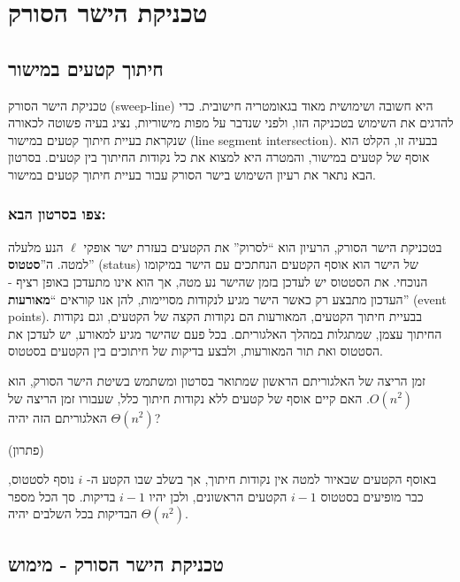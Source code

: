 \documentclass[
]{book}
\begin{document}
\hypertarget{sweep-line}{%
\section{טכניקת הישר הסורק}\label{sweep-line}}

\hypertarget{line-int}{%
\subsection{חיתוך קטעים במישור}\label{line-int}}

טכניקת הישר הסורק (sweep-line) היא חשובה ושימושית מאוד בגאומטריה
חישובית. כדי להדגים את השימוש בטכניקה הזו, ולפני שנדבר על מפות מישוריות,
נציג בעיה פשוטה לכאורה שנקראת בעיית חיתוך קטעים במישור (line segment
intersection). בבעיה זו, הקלט הוא אוסף של קטעים במישור, והמטרה היא למצוא
את כל נקודות החיתוך בין קטעים. בסרטון הבא נתאר את רעיון השימוש בישר
הסורק עבור בעיית חיתוך קטעים במישור.

\hypertarget{ux5e6ux5e4ux5d5-ux5d1ux5e1ux5e8ux5d8ux5d5ux5df-ux5d4ux5d1ux5d0-1}{%
\subsubsection*{צפו בסרטון הבא:}\label{ux5e6ux5e4ux5d5-ux5d1ux5e1ux5e8ux5d8ux5d5ux5df-ux5d4ux5d1ux5d0-1}}

בטכניקת הישר הסורק, הרעיון הוא ``לסרוק'' את הקטעים בעזרת ישר אופקי \(\ell\)
הנע מלעלה למטה. ה''\textbf{סטטוס}'' (status) של הישר הוא אוסף הקטעים הנחתכים עם
הישר במיקומו הנוכחי. את הסטטוס יש לעדכן בזמן שהישר נע מטה, אך הוא אינו
מתעדכן באופן רציף - העדכון מתבצע רק כאשר הישר מגיע לנקודות מסויימות, להן
אנו קוראים ``\textbf{מאורעות}'' (event points). בבעיית חיתוך הקטעים, המאורעות
הם נקודות הקצה של הקטעים, וגם נקודות החיתוך עצמן, שמתגלות במהלך
האלגוריתם. בכל פעם שהישר מגיע למאורע, יש לעדכן את הסטטוס ואת תור
המאורעות, ולבצע בדיקות של חיתוכים בין הקטעים בסטטוס.

זמן הריצה של האלגוריתם הראשון שמתואר בסרטון ומשתמש בשיטת הישר הסורק, הוא
\(O(n^2)\). האם קיים אוסף של קטעים ללא נקודות חיתוך כלל, שעבורו זמן הריצה
של האלגוריתם הזה יהיה \(\Theta(n^2)\)?

(פתרון)

באוסף הקטעים שבאיור למטה אין נקודות חיתוך, אך בשלב שבו הקטע ה- \(i\) נוסף
לסטטוס, כבר מופיעים בסטטוס \(i-1\) הקטעים הראשונים, ולכן יהיו \(i-1\)
בדיקות. סך הכל מספר הבדיקות בכל השלבים יהיה \(\Theta(n^2)\).

\hypertarget{line-sweep-impl}{%
\subsection{טכניקת הישר הסורק - מימוש}\label{line-sweep-impl}}
\end{document}
